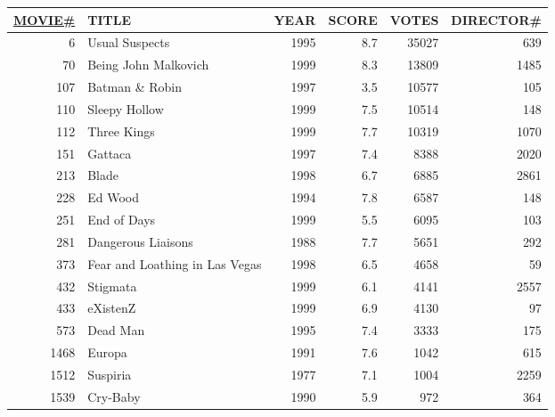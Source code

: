 \documentclass[dvipsnames]{beamer}
\theoremstyle{plain}
\begin{document}
\begin{frame}
  \begin{example}[MOVIE]
    \begin{tiny}
    \begin{table}
      \begin{tabular}{|r|l|r|r|r|r|}\hline
\underline{MOVIE\#} & TITLE           & YEAR & SCORE & VOTES & DIRECTOR\#\\[2pt]\hline\hline
   6 & Usual Suspects                 & 1995 &   8.7 & 35027 &        639\\\hline
  70 & Being John Malkovich           & 1999 &   8.3 & 13809 &       1485\\\hline
 107 & Batman \& Robin                & 1997 &   3.5 & 10577 &        105\\\hline
 110 & Sleepy Hollow                  & 1999 &   7.5 & 10514 &        148\\\hline
 112 & Three Kings                    & 1999 &   7.7 & 10319 &       1070\\\hline
 151 & Gattaca                        & 1997 &   7.4 &  8388 &       2020\\\hline
 213 & Blade                          & 1998 &   6.7 &  6885 &       2861\\\hline
 228 & Ed Wood                        & 1994 &   7.8 &  6587 &        148\\\hline
 251 & End of Days                    & 1999 &   5.5 &  6095 &        103\\\hline
 281 & Dangerous Liaisons             & 1988 &   7.7 &  5651 &        292\\\hline
 373 & Fear and Loathing in Las Vegas & 1998 &   6.5 &  4658 &         59\\\hline
 432 & Stigmata                       & 1999 &   6.1 &  4141 &       2557\\\hline
 433 & eXistenZ                       & 1999 &   6.9 &  4130 &         97\\\hline
 573 & Dead Man                       & 1995 &   7.4 &  3333 &        175\\\hline
1468 & Europa                         & 1991 &   7.6 &  1042 &        615\\\hline
1512 & Suspiria                       & 1977 &   7.1 &  1004 &       2259\\\hline
1539 & Cry-Baby                       & 1990 &   5.9 &   972 &        364\\\hline
    \end{tabular}
  \end{table}
  \end{tiny}
  \end{example}
\end{frame}
\end{document}
